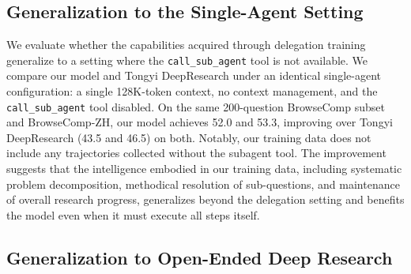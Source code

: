 \documentclass[table]{gtech}
\begin{document}
\subsection{Generalization to the Single-Agent Setting}

We evaluate whether the capabilities acquired through delegation training generalize to a setting where the \texttt{call\_sub\_agent} tool is not available. We compare our model and Tongyi DeepResearch under an identical single-agent configuration: a single 128K-token context, no context management, and the \texttt{call\_sub\_agent} tool disabled. On the same 200-question BrowseComp subset and BrowseComp-ZH, our model achieves 52.0 and 53.3, improving over Tongyi DeepResearch (43.5 and 46.5) on both. Notably, our training data does not include any trajectories collected without the subagent tool. The improvement suggests that the intelligence embodied in our training data, including systematic problem decomposition, methodical resolution of sub-questions, and maintenance of overall research progress, generalizes beyond the delegation setting and benefits the model even when it must execute all steps itself.

\subsection{Generalization to Open-Ended Deep Research}
\end{document}
